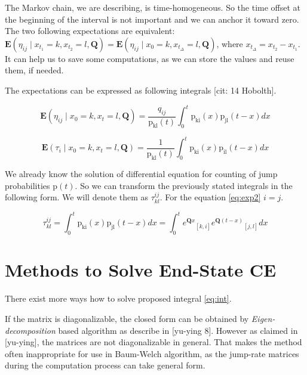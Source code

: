 \documentclass[thesis=M,english]{FITthesis}[2012/10/20]
\newcommand{\matr}[1]{\mathbf{#1}}
\begin{document}
The Markov chain, we are describing, is time-homogeneous. So the time offset at the beginning of the interval is not important and we can anchor it toward zero. The two following expectations are equivalent: $\mathbf{E}(\eta_{ij} \mid x_{t_1} = k, x_{t_2} = l, \matr{ Q } ) = \mathbf{E}(\eta_{ij} \mid x_0 = k, x_{t_\Delta} = l, \matr{ Q } )$, where $x_{t_\Delta} = x_{t_2} - x_{t_1}$. It can help us to save some computations, as we can store the values and reuse them, if needed.

The expectations can be expressed as following integrals [cit: 14 Hobolth].   

\begin{equation}\label{eq:exp1}
\mathbf{E}(\eta_{ij} \mid x_0 = k, x_t = l, \matr{ Q } ) = \frac{ q_{ij} }{ \mathrm{p_{kl}}(t) } 
\int_{0}^{t} \mathrm{p_{ki}}(x) \mathrm{p_{jl}}(t-x) dx
\end{equation}

\begin{equation}\label{eq:exp2}
\mathbf{E}( \tau_i \mid x_0 = k, x_t = l, \matr{ Q } ) = \frac{ 1 }{ \mathrm{p_{kl}}(t) } 
\int_{0}^{t} \mathrm{p_{ki}}(x) \mathrm{p_{il}}(t-x) dx
\end{equation}

We already know the solution of differential equation for counting of jump probabilities $\mathrm{p}(t)$. So we can transform the previously stated integrals in the following form. We will denote them as $\tau^{ij}_{kl}$. For the equation \eqref{eq:exp2} $i = j$. 

\begin{equation}\label{eq:int}
\tau^{ij}_{kl} = \int_{0}^{t} \mathrm{p_{ki}}(x) \mathrm{p_{jl}}(t-x) dx = 
\int_{0}^{t} {e^{\matr{Q}x}}_{[k,i]} {e^{\matr{Q}(t-x)}}_{[j,l]} dx
\end{equation} 

\section{Methods to Solve End-State CE }

There exist more ways how to solve proposed integral \eqref{eq:int}. 

If the matrix is diagonalizable, the closed form can be obtained by \textit{Eigen-decomposition} based algorithm as describe in [yu-ying 8]. However as claimed in [yu-ying], the matrices are not diagonalizable in general. That makes the method often inappropriate for use in Baum-Welch algorithm, as the jump-rate matrices during the computation process can take general form.
\end{document}
